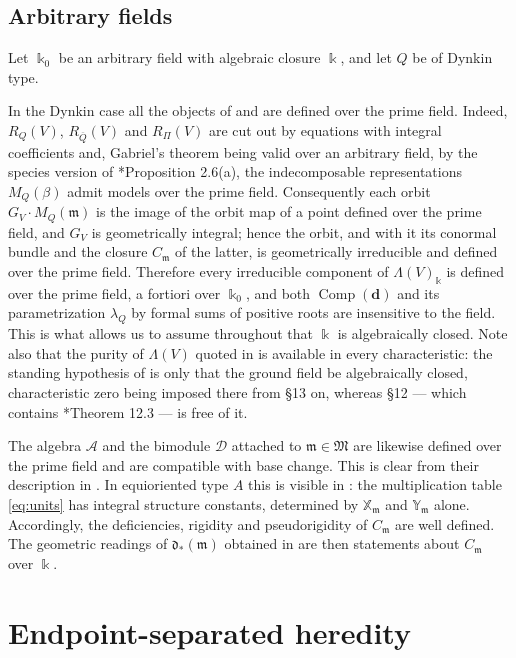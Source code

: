 \documentclass[12pt]{article}
\def\xspace{ }%
\theoremstyle{definition}
\newcommand{\prigity}{pseudorigidity\xspace}
\newcommand{\bd}{\boldsymbol{d}}  %
\newcommand{\Comp}{\operatorname{Comp}}
\newcommand{\cmp}{C}                       %
\newcommand{\Mfr}{\mathfrak{M}}
\newcommand{\mm}{\mathfrak{m}}
\newcommand{\kk}{\Bbbk}
\newcommand{\alg}{\mathcal{A}}   %
\newcommand{\bmdl}{\mathcal{D}}   %
\newcommand{\XX}{\mathbb{X}}  %
\newcommand{\YY}{\mathbb{Y}}  %
\newcommand{\dfr}{\mathfrak{d}}  %
\newcommand{\rsub}{\sharp}       %
\newcommand{\psub}{\flat}        %
\begin{document}
\subsection{Arbitrary fields}\label{ssec:arbnilp}

Let $\kk_0$ be an arbitrary field with algebraic closure $\kk$, and let $Q$ be
of Dynkin type.

In the Dynkin case all the objects of  and
 are defined over the prime field. Indeed, $R_Q(V)$,
$R_{\overline{Q}}(V)$ and $R_\Pi(V)$ are cut out by equations with integral
coefficients and, Gabriel's theorem being valid over an arbitrary field, by
the species version of \cite{MR447344}*{Proposition 2.6(a)}, the
indecomposable representations $M_Q(\beta)$ admit models over the prime field.
Consequently each orbit $G_V\cdot M_Q(\mm)$ is the image of the orbit map of a
point defined over the prime field, and $G_V$ is geometrically integral; hence
the orbit, and with it its conormal bundle and the closure $\cmp_\mm$ of the
latter, is geometrically irreducible and defined over the prime field.
Therefore every irreducible component of $\Lambda(V)_{\kk}$ is
defined over the prime field, a fortiori over $\kk_0$, and both $\Comp(\bd)$ and its parametrization
$\lambda_Q$ by formal sums of positive roots are insensitive to the field. This is what allows
us to assume throughout that $\kk$ is algebraically closed. Note also that
the purity of $\Lambda(V)$ quoted in  is available in
every characteristic: the standing hypothesis of \cite{MR1088333} is only
that the ground field be algebraically closed, characteristic zero being
imposed there from \S13 on, whereas \S12 --- which contains
\cite{MR1088333}*{Theorem 12.3} --- is free of it.

The algebra $\alg$ and the bimodule $\bmdl$ attached to $\mm \in \Mfr$ are
likewise defined over the prime field and are compatible with base change. This is clear from their description in .
In equioriented type $A$ this is visible in : the multiplication
table \eqref{eq:units} has integral structure constants, determined by
$\XX_\mm$ and $\YY_\mm$ alone.
Accordingly, the deficiencies, rigidity and \prigity of $\cmp_\mm$ are well defined. The geometric readings of $\dfr_\ast(\mm)$ obtained in
 are then statements about $\cmp_\mm$ over $\kk$.

\section{Endpoint-separated heredity}\label{sec:esi}
\end{document}
